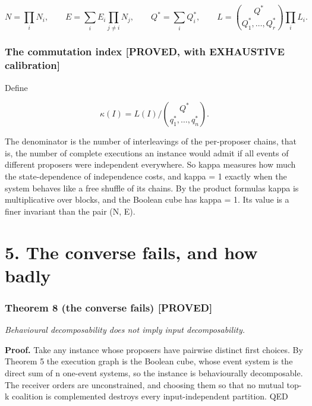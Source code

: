 \documentclass[
  11pt,
]{article}
\begin{document}
\[
N=\prod_i N_i,\qquad E=\sum_i E_i\prod_{j\neq i}N_j,\qquad Q^{*}=\sum_i Q_i^{*},\qquad L=\binom{Q^{*}}{Q_1^{*},\dots ,Q_r^{*}}\prod_i L_i .
\]

\hypertarget{the-commutation-index-proved-with-exhaustive-calibration}{%
\subsubsection{The commutation index {[}PROVED, with EXHAUSTIVE
calibration{]}}\label{the-commutation-index-proved-with-exhaustive-calibration}}

Define

\[
\kappa(I)=L(I)\Big/\binom{Q^{*}}{q^{*}_1,\dots ,q^{*}_n}.
\]

The denominator is the number of interleavings of the per-proposer
chains, that is, the number of complete executions an instance would
admit if all events of different proposers were independent everywhere.
So kappa measures how much the state-dependence of independence costs,
and kappa = 1 exactly when the system behaves like a free shuffle of its
chains. By the product formulas kappa is multiplicative over blocks, and
the Boolean cube has kappa = 1. Its value is a finer invariant than the
pair (N, E).

\clearpage

\hypertarget{the-converse-fails-and-how-badly}{%
\section{5. The converse fails, and how
badly}\label{the-converse-fails-and-how-badly}}

\hypertarget{theorem-8-the-converse-fails-proved}{%
\subsubsection{Theorem 8 (the converse fails)
{[}PROVED{]}}\label{theorem-8-the-converse-fails-proved}}

\emph{Behavioural decomposability does not imply input decomposability.}

\textbf{Proof.} Take any instance whose proposers have pairwise distinct
first choices. By Theorem 5 the execution graph is the Boolean cube,
whose event system is the direct sum of n one-event systems, so the
instance is behaviourally decomposable. The receiver orders are
unconstrained, and choosing them so that no mutual top-k coalition is
complemented destroys every input-independent partition. QED
\end{document}
